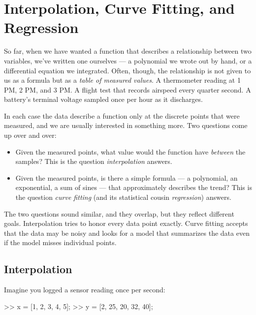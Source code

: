 \documentclass[../../book.tex]{subfiles}
\begin{document}
\chapter{Interpolation, Curve Fitting, and Regression}
\label{interpolation_curvefit}


So far, when we have wanted a function that describes a relationship between two variables, we've written one ourselves --- a polynomial we wrote out by hand, or a differential equation we integrated.  Often, though, the relationship is not given to us as a formula but as a \emph{table of measured values}.  A thermometer reading at 1 PM, 2 PM, and 3 PM.  A flight test that records airspeed every quarter second.  A battery's terminal voltage sampled once per hour as it discharges.

In each case the data describe a function only at the discrete points that were measured, and we are usually interested in something more.  Two questions come up over and over:

\begin{itemize}
    \item Given the measured points, what value would the function have \emph{between} the samples?  This is the question \emph{interpolation} answers.
    \item Given the measured points, is there a simple formula --- a polynomial, an exponential, a sum of sines --- that approximately describes the trend?  This is the question \emph{curve fitting} (and its statistical cousin \emph{regression}) answers.
\end{itemize}

The two questions sound similar, and they overlap, but they reflect different goals.  Interpolation tries to honor every data point exactly.  Curve fitting accepts that the data may be noisy and looks for a model that summarizes the data even if the model misses individual points.


\section{Interpolation}


Imagine you logged a sensor reading once per second:

\begin{code}
>> x = [1, 2, 3, 4, 5];
>> y = [2, 25, 20, 32, 40];
\end{code}
\end{document}
